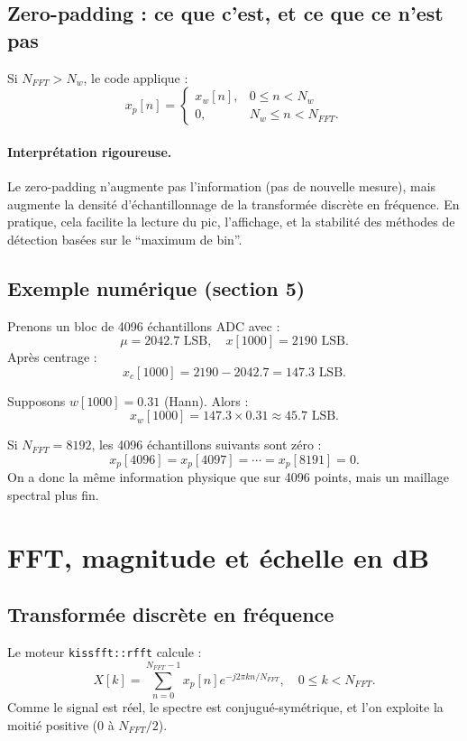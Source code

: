 \documentclass[a4paper,11pt]{article}
\begin{document}
\subsection{Zero-padding : ce que c'est, et ce que ce n'est pas}

Si \(N_{FFT}>N_w\), le code applique :
\[
x_p[n]=
\begin{cases}
x_w[n], & 0\le n < N_w\\
0, & N_w \le n < N_{FFT}.
\end{cases}
\]

\paragraph{Interpr\'etation rigoureuse.}
Le zero-padding n'augmente pas l'information (pas de nouvelle mesure), mais augmente la densit\'e d'\'echantillonnage de la transform\'ee discr\`ete en fr\'equence. En pratique, cela facilite la lecture du pic, l'affichage, et la stabilit\'e des m\'ethodes de d\'etection bas\'ees sur le ``maximum de bin''.

\subsection{Exemple num\'erique (section 5)}

Prenons un bloc de 4096 \'echantillons ADC avec :
\[
\mu = 2042.7 \text{ LSB},\quad x[1000]=2190 \text{ LSB}.
\]
Apr\`es centrage :
\[
x_c[1000]=2190-2042.7=147.3 \text{ LSB}.
\]

Supposons \(w[1000]=0.31\) (Hann). Alors :
\[
x_w[1000]=147.3\times 0.31 \approx 45.7 \text{ LSB}.
\]

Si \(N_{FFT}=8192\), les 4096 \'echantillons suivants sont z\'ero :
\[
x_p[4096]=x_p[4097]=\cdots=x_p[8191]=0.
\]
On a donc la m\^eme information physique que sur 4096 points, mais un maillage spectral plus fin.

\section{FFT, magnitude et \'echelle en dB}

\subsection{Transform\'ee discr\`ete en fr\'equence}

Le moteur \texttt{kissfft::rfft} calcule :
\[
X[k]=\sum_{n=0}^{N_{FFT}-1}x_p[n]e^{-j2\pi kn/N_{FFT}},\quad 0\le k < N_{FFT}.
\]
Comme le signal est r\'eel, le spectre est conjugu\'e-sym\'etrique, et l'on exploite la moiti\'e positive (\(0\) \`a \(N_{FFT}/2\)).
\end{document}
